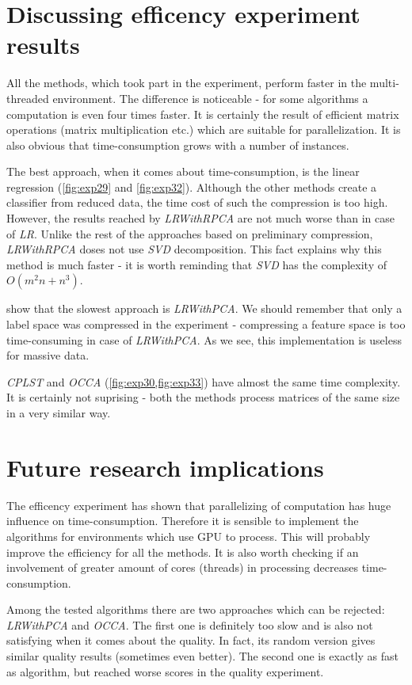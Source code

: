 \section{Discussing efficency experiment results}

All the methods, which took part in the experiment, perform faster in the multi-threaded environment. The difference is noticeable - for some algorithms a computation is even four times faster. It is certainly the result of efficient matrix operations (matrix multiplication etc.) which are suitable for parallelization. It is also obvious that time-consumption grows with a number of instances.

The best approach, when it comes about time-consumption, is the linear regression (\cref{fig:exp29} and \cref{fig:exp32}). Although the other methods create a classifier from reduced data, the time cost of such the compression is too high. However, the results reached by \textit{LRWithRPCA} are not much worse than in case of \textit{LR}. Unlike the rest of the approaches based on preliminary compression, \textit{LRWithRPCA} doses not use \textit{SVD} decomposition. This fact explains why this method is much faster - it is worth reminding that \textit{SVD} has the complexity of $O(m^2n+n^3)$. 

 show that the slowest approach is \textit{LRWithPCA}. We should remember that only a label space was compressed in the experiment - compressing a feature space is too time-consuming in case of \textit{LRWithPCA}. As we see, this implementation is useless for massive data. 

\textit{CPLST} and \textit{OCCA} (\cref{fig:exp30,fig:exp33}) have almost the same time complexity. It is certainly not suprising - both the methods process matrices of the same size in a very similar way.

\section{Future research implications}

The efficency experiment has shown that parallelizing of computation has huge influence on time-consumption. Therefore it is sensible to implement the algorithms for environments which use GPU to process. This will probably improve the efficiency for all the methods. It is also worth checking if an involvement of greater amount of cores (threads) in processing decreases time-consumption.  

Among the tested algorithms there are two approaches which can be rejected: \textit{LRWithPCA} and \textit{OCCA}. The first one is definitely too slow and is also not satisfying when it comes about the quality. In fact, its random version gives similar quality results (sometimes even better). The second one is exactly as fast as  algorithm, but reached worse scores in the quality experiment. 

